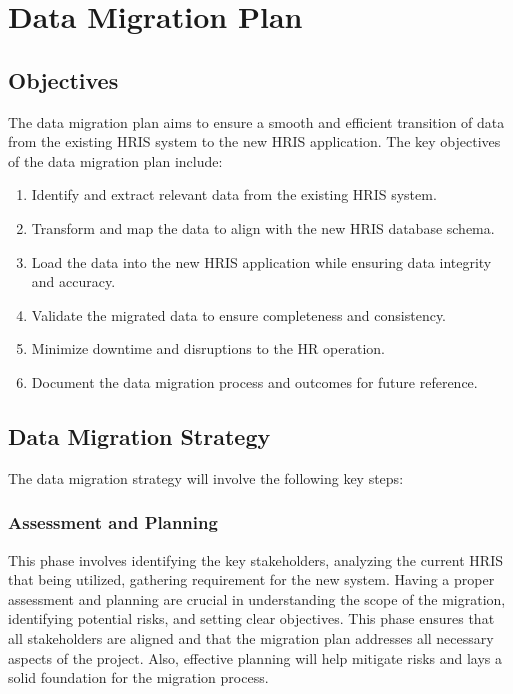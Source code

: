 \section{Data Migration Plan}

    \subsection{Objectives}

    The data migration plan aims to ensure a smooth and efficient transition of data from the existing HRIS system to the new HRIS application. The key objectives of the data migration plan include:

    \begin{enumerate}
        \item Identify and extract relevant data from the existing HRIS system.
        \item Transform and map the data to align with the new HRIS database schema.
        \item Load the data into the new HRIS application while ensuring data integrity and accuracy.
        \item Validate the migrated data to ensure completeness and consistency.
        \item Minimize downtime and disruptions to the HR operation.
        \item Document the data migration process and outcomes for future reference.
    \end{enumerate}

    \subsection{Data Migration Strategy}

    The data migration strategy will involve the following key steps:
    
        \subsubsection{Assessment and Planning}
            This phase involves identifying the key stakeholders, analyzing the current HRIS that being utilized, gathering requirement for the new system. Having a proper assessment and planning are crucial in understanding the scope of the migration, identifying potential risks, and setting clear objectives. This phase ensures that all stakeholders are aligned and that the migration plan addresses all necessary aspects of the project. Also, effective planning will help mitigate risks and lays a solid foundation for the migration process.

